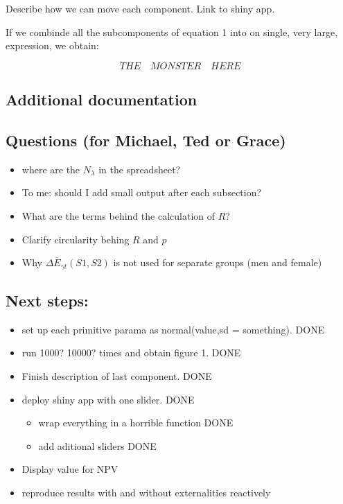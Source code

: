 \documentclass[]{article}
\providecommand{\tightlist}{%
  \setlength{\itemsep}{0pt}\setlength{\parskip}{0pt}}
\begin{document}
Describe how we can move each component. Link to shiny app.

If we combinde all the subcomponents of equation 1 into on single, very
large, expression, we obtain:

\begin{equation}
THE\quad MONSTER\quad HERE
\end{equation}

\hypertarget{additional-documentation}{%
\subsection{Additional documentation}\label{additional-documentation}}

\hypertarget{questions-for-michael-ted-or-grace}{%
\subsection{Questions (for Michael, Ted or
Grace)}\label{questions-for-michael-ted-or-grace}}

\begin{itemize}
\tightlist
\item
  where are the \(N_\lambda\) in the spreadsheet?
\item
  To me: should I add small output after each subsection?
\item
  What are the terms behind the calculation of \(R\)?
\item
  Clarify circularity behing \(R\) and \(p\)
\item
  Why \(\Delta \overline{E}_{\gamma t}(S1,S2)\) is not used for separate
  groups (men and female)
\end{itemize}

\hypertarget{next-steps}{%
\subsection{Next steps:}\label{next-steps}}

\begin{itemize}
\tightlist
\item
  set up each primitive parama as normal(value,sd = something). DONE
\item
  run 1000? 10000? times and obtain figure 1. DONE
\item
  Finish description of last component. DONE
\item
  deploy shiny app with one slider. DONE

  \begin{itemize}
  \tightlist
  \item
    wrap everything in a horrible function DONE
  \item
    add aditional sliders DONE
  \end{itemize}
\item
  Display value for NPV
\item
  reproduce results with and without externalities reactively
\end{itemize}
\end{document}
